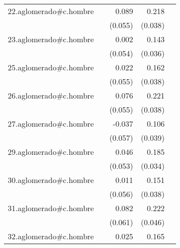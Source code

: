 {\begin{longtable}{l*{4}{D{.}{.}{-1}}}
\addlinespace
22.aglomerado#c.hombre&                     &       0.089         &       0.218\sym{***}&                     \\
            &                     &     (0.055)         &     (0.038)         &                     \\
\addlinespace
23.aglomerado#c.hombre&                     &       0.002         &       0.143\sym{***}&                     \\
            &                     &     (0.054)         &     (0.036)         &                     \\
\addlinespace
25.aglomerado#c.hombre&                     &       0.022         &       0.162\sym{***}&                     \\
            &                     &     (0.055)         &     (0.038)         &                     \\
\addlinespace
26.aglomerado#c.hombre&                     &       0.076         &       0.221\sym{***}&                     \\
            &                     &     (0.055)         &     (0.038)         &                     \\
\addlinespace
27.aglomerado#c.hombre&                     &      -0.037         &       0.106\sym{**} &                     \\
            &                     &     (0.057)         &     (0.039)         &                     \\
\addlinespace
29.aglomerado#c.hombre&                     &       0.046         &       0.185\sym{***}&                     \\
            &                     &     (0.053)         &     (0.034)         &                     \\
\addlinespace
30.aglomerado#c.hombre&                     &       0.011         &       0.151\sym{***}&                     \\
            &                     &     (0.056)         &     (0.038)         &                     \\
\addlinespace
31.aglomerado#c.hombre&                     &       0.082         &       0.222\sym{***}&                     \\
            &                     &     (0.061)         &     (0.046)         &                     \\
\addlinespace
32.aglomerado#c.hombre&                     &       0.025         &       0.165\sym{***}&                     \\

\end{longtable}}
